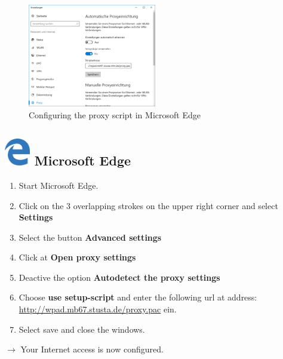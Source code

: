 \documentclass[a4paper,12pt]{scrartcl}
\begin{document}
\begin{figure}
	\begin{center}
		\includegraphics[width=0.5\textwidth,keepaspectratio]{Bilder/Proxy_Edge_mb}
	\end{center}
	\caption{Configuring the proxy script in Microsoft Edge}
\end{figure}

\subsection*{\includegraphics[height=1.2cm,keepaspectratio]{Bilder/Mcrosoft_Edge_logo} Microsoft Edge}
\begin{enumerate}
	\item Start Microsoft Edge.
	\item Click on the 3 overlapping strokes on the upper right corner and select \textbf{Settings}
	\item Select the button \textbf{Advanced settings}
	\item Click at \textbf{Open proxy settings}
	\item Deactive the option \textbf{Autodetect the proxy settings}
	\item Choose \textbf{use setup-script} and enter the following url at address: \\ \url{http://wpad.mb67.stusta.de/proxy.pac} ein.
	\item Select save and close the windows.
\end{enumerate}
$\rightarrow$ Your Internet access is now configured.
\end{document}
